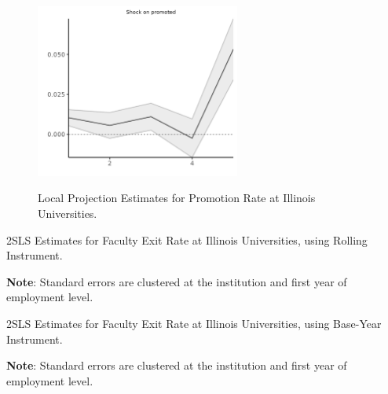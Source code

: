 \begin{figure}[H]
    \centering
    \singlespacing
    \caption{Local Projection Estimates for Promotion Rate at Illinois Universities.}
    \includegraphics[width=0.6\textwidth]{figures/promoted-illinois-lp-rolling.png}
    \label{fig:promoted-illinois-lp}
\end{figure}

\begin{table}[H]
    \singlespacing
    \centering
    \caption{2SLS Estimates for Faculty Exit Rate at Illinois Universities, using Rolling Instrument.}
    \makebox[\textwidth][c]{}
    \begin{flushleft}
        \footnotesize
        \textbf{Note}: Standard errors are clustered at the institution and first year of employment level.
    \end{flushleft}
    \label{tab:facultyleaving-shock-illinois-rolling}
\end{table}

\begin{table}[H]
    \singlespacing
    \centering
    \caption{2SLS Estimates for Faculty Exit Rate at Illinois Universities, using Base-Year Instrument.}
    \makebox[\textwidth][c]{}
    \begin{flushleft}
        \footnotesize
        \textbf{Note}: Standard errors are clustered at the institution and first year of employment level.
    \end{flushleft}
    \label{tab:facultyleaving-shock-illinois}
\end{table}
